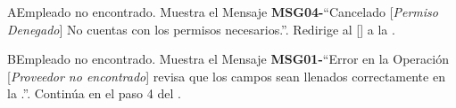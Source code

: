 \begin{UCtrayectoriaA}{A}{Empleado no encontrado.}
			\UCpaso Muestra el Mensaje {\bf MSG04-}``Cancelado [{\em Permiso Denegado}] No cuentas con los permisos necesarios.''.
			\UCpaso Redirige al [\UCactor] a la  .
		\end{UCtrayectoriaA}

\begin{UCtrayectoriaA}{B}{Empleado no encontrado.}
			\UCpaso Muestra el Mensaje {\bf MSG01-}``Error en la Operación [{\em Proveedor no encontrado}] revisa que los campos sean llenados correctamente en la .''.
			\UCpaso Continúa en el paso 4 del .
		\end{UCtrayectoriaA}
